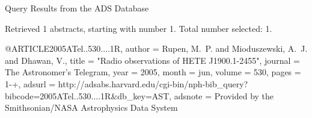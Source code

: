 Query Results from the ADS Database


Retrieved 1 abstracts, starting with number 1.  Total number selected: 1.

@ARTICLE{2005ATel..530....1R,
   author = {{Rupen}, M.~P. and {Mioduszewski}, A.~J. and {Dhawan}, V.},
    title = "{Radio observations of HETE J1900.1-2455}",
  journal = {The Astronomer's Telegram},
     year = 2005,
    month = jun,
   volume = 530,
    pages = {1-+},
   adsurl = {http://adsabs.harvard.edu/cgi-bin/nph-bib_query?bibcode=2005ATel..530....1R&db_key=AST},
  adsnote = {Provided by the Smithsonian/NASA Astrophysics Data System}
}


